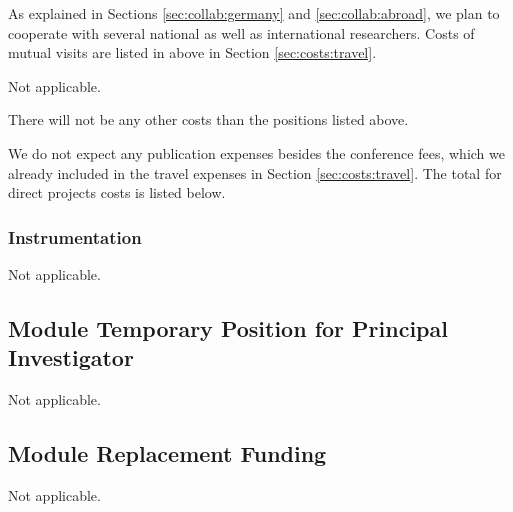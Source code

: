 \begin{funds}
\end{funds}


As explained in Sections \ref{sec:collab:germany} and \ref{sec:collab:abroad}, we plan to cooperate with several national as well as international researchers. Costs of mutual visits are listed in above in Section \ref{sec:costs:travel}.


Not applicable. 


There will not be any other costs than the positions listed above. 


We do not expect any publication expenses besides the conference fees, which we already included in the travel expenses in Section \ref{sec:costs:travel}. The total for direct projects costs is listed below. 

\subsubsection{Instrumentation}

Not applicable. 

\subsection{Module Temporary Position for Principal Investigator}

Not applicable. 

\subsection{Module Replacement Funding}

Not applicable. 